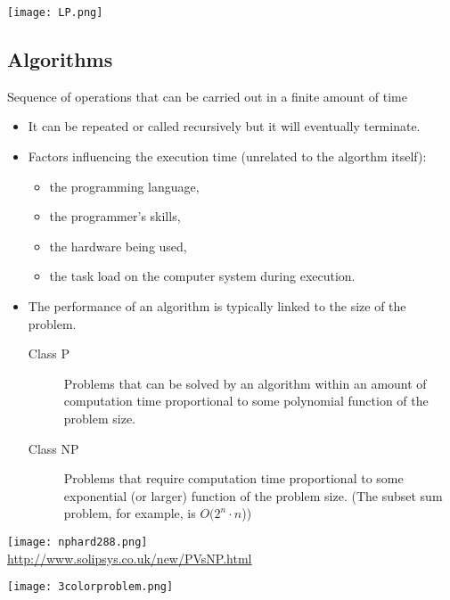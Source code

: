       \begin{center}
        \texttt{[image: LP.png]}
      \end{center}

\subsection{Algorithms}


    Sequence of operations that can be carried out in a finite amount of time
  \begin{itemize}
    \item It can be repeated or called recursively but it will eventually terminate.
    \item Factors influencing the execution time (unrelated to the algorthm itself):
    \begin{itemize}
      \item the programming language,
      \item the programmer's skills,
      \item the hardware being used,
      \item the task load on the computer system during execution.
    \end{itemize}
    \item The performance of an algorithm is typically linked to the size of the problem.
    \begin{description}
      \item [Class P] Problems that can be solved by an algorithm within an amount of computation time proportional to some polynomial function of the problem size.
      \item [Class NP] Problems that require computation time proportional to some exponential (or larger) function of the problem size. (The subset sum problem, for example, is $O(2^n\cdot n$))
    \end{description}
  \end{itemize}


   
      \begin{center}
        \texttt{[image: nphard288.png]}\\
        \footnotesize{\url{http://www.solipsys.co.uk/new/PVsNP.html}}
      \end{center}
   

  \texttt{[image: 3colorproblem.png]}



